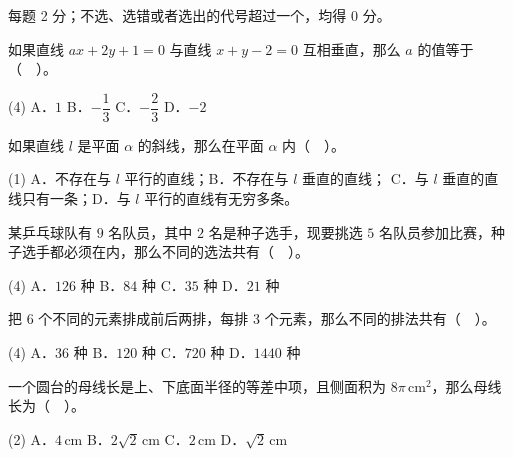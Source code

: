 


每题 2 分；不选、选错或者选出的代号超过一个，均得 0 分。

\begin{question}
如果直线 $ax+2y+1=0$ 与直线 $x+y-2=0$ 互相垂直，那么 $a$ 的值等于（　）。

\begin{gkopts}(4)
\task A．$1$
\task B．$-\dfrac{1}{3}$
\task C．$-\dfrac{2}{3}$
\task D．$-2$
\end{gkopts}

\end{question}
\begin{question}
如果直线 $l$ 是平面 $\alpha$ 的斜线，那么在平面 $\alpha$ 内（　）。

\begin{gkopts}(1)
\task A．不存在与 $l$ 平行的直线；B．不存在与 $l$ 垂直的直线；
\task C．与 $l$ 垂直的直线只有一条；D．与 $l$ 平行的直线有无穷多条。
\end{gkopts}

\end{question}
\begin{question}
某乒乓球队有 $9$ 名队员，其中 $2$ 名是种子选手，现要挑选 $5$ 名队员参加比赛，种子选手都必须在内，那么不同的选法共有（　）。

\begin{gkopts}(4)
\task A．$126$ 种
\task B．$84$ 种
\task C．$35$ 种
\task D．$21$ 种
\end{gkopts}

\end{question}
\begin{question}
把 $6$ 个不同的元素排成前后两排，每排 $3$ 个元素，那么不同的排法共有（　）。

\begin{gkopts}(4)
\task A．$36$ 种
\task B．$120$ 种
\task C．$720$ 种
\task D．$1440$ 种
\end{gkopts}

\end{question}
\begin{question}
一个圆台的母线长是上、下底面半径的等差中项，且侧面积为 $8\pi\,\mathrm{cm}^2$，那么母线长为（　）。

\begin{gkopts}(2)
\task A．$4\,\mathrm{cm}$
\task B．$2\sqrt2\,\mathrm{cm}$
\task C．$2\,\mathrm{cm}$
\task D．$\sqrt2\,\mathrm{cm}$
\end{gkopts}

\end{question}
